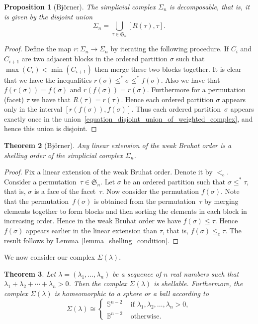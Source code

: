 \documentclass[10pt]{amsart}
\newtheorem{theorem}{Theorem}[section]
\newtheorem{prop}[theorem]{Proposition}
\theoremstyle{definition}
\newcommand{\Bbbb}{\mathbb{B}}
\newcommand{\Sss}{\mathbb{S}}
\newcommand{\Sym}{\mathfrak{S}}
\newcommand{\lambdasumpositive}
{\lambda_{1} + \lambda_{2} + \cdots + \lambda_{n} > 0}
\begin{document}
\begin{prop}[Bj\"orner]
The simplicial complex $\Sigma_{n}$
is decomposable, that is, it is
given by the disjoint union
\begin{equation}
     \Sigma_{n} = \bigcup_{\tau \in \Sym_{n}} [R(\tau), \tau] .
\label{equation_disjoint_union_of_weighted_complex}
\end{equation}
\label{proposition_Sigma_decomposition}
\end{prop}
\begin{proof}
Define the map $r : \Sigma_{n} \longrightarrow \Sigma_{n}$
by iterating the following procedure.
If $C_{i}$ and $C_{i+1}$ are two adjacent blocks in the ordered partition $\sigma$
such that $\max(C_{i}) < \min(C_{i+1})$ then
merge these two blocks together.
It is clear that we have the inequalities
$r(\sigma) \leq^{*} \sigma \leq^{*} f(\sigma)$.
Also we have that $f(r(\sigma)) = f(\sigma)$
and $r(f(\sigma)) = r(\sigma)$.
Furthermore for a permutation (facet) $\tau$ we have that
$R(\tau) = r(\tau)$.
Hence each ordered partition
$\sigma$ appears only in the interval $[r(f(\sigma)), f(\sigma)]$.
Thus each ordered partition~$\sigma$ appears
exactly once 
in the union~\eqref{equation_disjoint_union_of_weighted_complex},
and hence this union is disjoint.
\end{proof}


\begin{theorem}[Bj\"orner]
Any linear extension of the weak Bruhat order is
a shelling order of the simplicial complex $\Sigma_{n}$.
\label{theorem_linear_extension_of_Bruhat_order}
\end{theorem}
\begin{proof}
Fix a linear extension of the weak Bruhat order.
Denote it by $<_{e}$.
Consider a permutation~$\tau \in \Sym_{n}$.
Let $\sigma$ be an ordered partition
such that $\sigma \leq^{*} \tau$,
that is, $\sigma$ is a face of the facet~$\tau$.
Now consider the permutation $f(\sigma)$.
Note that the permutation~$f(\sigma)$ is obtained from
the permutation~$\tau$ by merging elements together
to form blocks
and then sorting the elements in each block in increasing order.
Hence in the weak Bruhat order we have
$f(\sigma) \leq \tau$.
Hence $f(\sigma)$ appears earlier in the linear extension than $\tau$,
that is, $f(\sigma) \leq_{e} \tau$.
The result follows by
Lemma~\ref{lemma_shelling_condition}.
\end{proof}


We now consider our complex $\Sigma(\lambda)$.
\begin{theorem}
Let $\lambda = (\lambda_{1}, \ldots, \lambda_{n})$ be a sequence of
$n$ real numbers
such that $\lambdasumpositive$.
Then the complex $\Sigma(\lambda)$ is shellable.
Furthermore,
the complex $\Sigma(\lambda)$ is homeomorphic to a sphere or a ball
according to
$$
\Sigma(\lambda)
\cong
\begin{cases}
\Sss^{n-2} & \text{ if } \lambda_{1}, \lambda_{2}, \ldots, \lambda_{n} > 0, \\
\Bbbb^{n-2} & \text{ otherwise. }
\end{cases}
$$
\label{theorem_lots_of_shellings}
\end{theorem}
\end{document}
